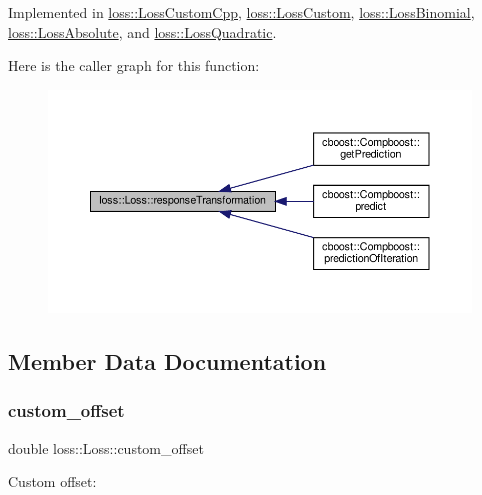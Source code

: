 Implemented in \hyperlink{classloss_1_1_loss_custom_cpp_ace7a23f6b0da58d12f1dec29e26acf18}{loss\+::\+Loss\+Custom\+Cpp}, \hyperlink{classloss_1_1_loss_custom_a42d9a0131836a056551c1073474cc8b9}{loss\+::\+Loss\+Custom}, \hyperlink{classloss_1_1_loss_binomial_a757fd8d478732ce94e8ba9497846bcf4}{loss\+::\+Loss\+Binomial}, \hyperlink{classloss_1_1_loss_absolute_a490d0fdab3e1af9cddbca77b8170263a}{loss\+::\+Loss\+Absolute}, and \hyperlink{classloss_1_1_loss_quadratic_a2534e3ec615acd6d0c80c2dbcfb8c1e9}{loss\+::\+Loss\+Quadratic}.

Here is the caller graph for this function\+:\nopagebreak
\begin{figure}[H]
\begin{center}
\leavevmode
\includegraphics[width=350pt]{classloss_1_1_loss_a0a84b7df79b08e40b538aaa7e6ee75c4_icgraph}
\end{center}
\end{figure}


\subsection{Member Data Documentation}
\mbox{\label{classloss_1_1_loss_ae5dc373f54ed65ee0ca54a921ef826f4}} 
\subsubsection{\texorpdfstring{custom\+\_\+offset}{custom\_offset}}
{\footnotesize\ttfamily double loss\+::\+Loss\+::custom\+\_\+offset\hspace{0.3cm}{\ttfamily [protected]}}



Custom offset\+: 

